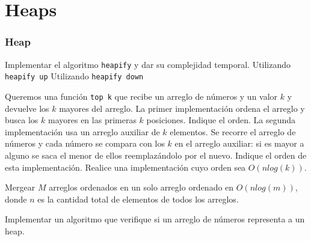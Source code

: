 \documentclass[titlepage,oneside]{book}
\begin{document}
\chapter{Heaps}

\subsection{Heap}

\begin{Exercise}
	Implementar el algoritmo \texttt{heapify} y dar su complejidad temporal.
	\Question Utilizando \texttt{heapify up}
	\Question Utilizando \texttt{heapify down}
\end{Exercise}

\begin{Exercise}
    Queremos una función \texttt{top k} que recibe un arreglo de números y un valor $k$ y devuelve los $k$ mayores del arreglo.
	\Question La primer implementación ordena el arreglo y busca los $k$ mayores en las primeras $k$ posiciones. Indique el orden.
	\Question La segunda implementación usa un arreglo auxiliar de $k$ elementos. Se recorre el arreglo de números y cada número se compara con los $k$ en el arreglo auxiliar: si es mayor a alguno se saca el menor de ellos reemplazándolo por el nuevo. Indique el orden de esta implementación.
    \Question Realice una implementación cuyo orden sea $O(n log(k))$.
\end{Exercise}

\begin{Exercise}
    Mergear $M$ arreglos ordenados en un solo arreglo ordenado en $O(n log(m))$, donde $n$ es la cantidad total de elementos de todos los arreglos.
\end{Exercise}

\begin{Exercise}
    Implementar un algoritmo que verifique si un arreglo de números representa a un heap.
\end{Exercise}
\end{document}

